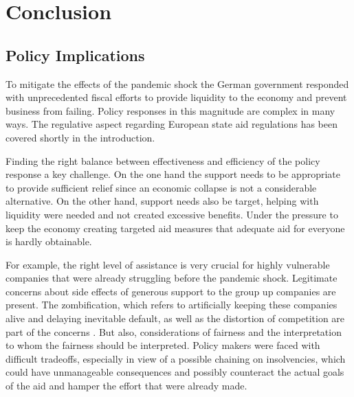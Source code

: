 
\chapter{Conclusion} %

\label{Chapter6} %


\section{Policy Implications}

To mitigate the effects of the pandemic shock the German government responded with unprecedented fiscal efforts to provide liquidity to the economy and prevent business from failing. Policy responses in this magnitude are complex in many ways. The regulative aspect regarding European state aid regulations has been covered shortly in the introduction.

Finding the right balance between effectiveness and efficiency of the policy response a key challenge. On the one hand the support needs to be appropriate to provide sufficient relief since an economic collapse is not a considerable alternative. On the other hand, support needs also be target, helping with liquidity were needed and not created excessive benefits. 
Under the pressure to keep the economy creating targeted aid measures that adequate aid for everyone is hardly obtainable.

For example, the right level of assistance is very crucial for highly vulnerable companies that were already struggling before the pandemic shock. Legitimate concerns about side effects of generous support to the group up companies are present. The zombification, which refers to artificially keeping these companies alive and delaying inevitable default, as well as the distortion of competition are part of the concerns \parencite{dorr_small_2022}. But also, considerations of fairness and the interpretation to whom the fairness should be interpreted. Policy makers were faced with difficult tradeoffs, especially in view of a possible chaining on insolvencies, which could have unmanageable consequences and possibly counteract the actual goals of the aid and hamper the effort that were already made.

